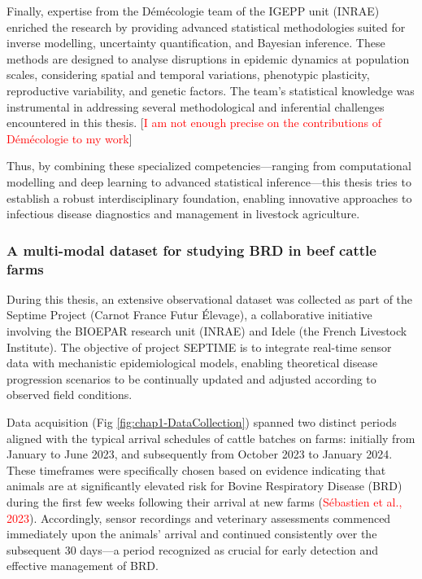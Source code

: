 Finally, expertise from the Démécologie team of the IGEPP unit (INRAE) enriched the research by providing advanced statistical methodologies suited for inverse modelling, uncertainty quantification, and Bayesian inference. These methods are designed to analyse disruptions in epidemic dynamics at population scales, considering spatial and temporal variations, phenotypic plasticity, reproductive variability, and genetic factors. The team's statistical knowledge was instrumental in addressing several methodological and inferential challenges encountered in this thesis. [\textcolor{red}{I am not enough precise on the contributions of Démécologie to my work}]

Thus, by combining these specialized competencies—ranging from computational modelling and deep learning to advanced statistical inference—this thesis tries to establish a robust interdisciplinary foundation, enabling innovative approaches to infectious disease diagnostics and management in livestock agriculture.

\subsubsection{A multi-modal dataset for studying BRD in beef cattle farms}

During this thesis, an extensive observational dataset was collected as part of the Septime Project (Carnot France Futur Élevage), a collaborative initiative involving the BIOEPAR research unit (INRAE) and Idele (the French Livestock Institute). The objective of project SEPTIME is to integrate real-time sensor data with mechanistic epidemiological models, enabling theoretical disease progression scenarios to be continually updated and adjusted according to observed field conditions.

Data acquisition (Fig \ref{fig:chap1-DataCollection}) spanned two distinct periods aligned with the typical arrival schedules of cattle batches on farms: initially from January to June 2023, and subsequently from October 2023 to January 2024. These timeframes were specifically chosen based on evidence indicating that animals are at significantly elevated risk for Bovine Respiratory Disease (BRD) during the first few weeks following their arrival at new farms (\textcolor{red}{Sébastien et al., 2023}). Accordingly, sensor recordings and veterinary assessments commenced immediately upon the animals' arrival and continued consistently over the subsequent 30 days—a period recognized as crucial for early detection and effective management of BRD.

